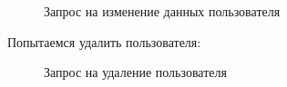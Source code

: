 \documentclass[coursework]{SCWorks}
\begin{document}
\begin{figure}[H]
	\caption{Запрос на изменение данных пользователя}
	\label{pic7}
\end{figure}

Попытаемся удалить пользователя:

\begin{figure}[H]
	\caption{Запрос на удаление пользователя}
	\label{pic8}
\end{figure}
\end{document}
